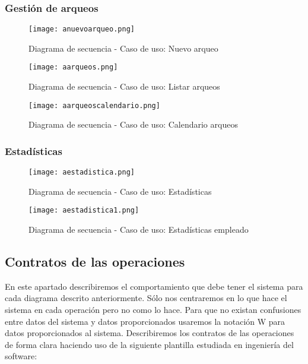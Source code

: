 \subsubsection{Gestión de arqueos}
\begin{figure}[!htb]
  \centering
    \texttt{[image: anuevoarqueo.png]}
  \caption{Diagrama de secuencia - Caso de uso: Nuevo arqueo }
  \label{a}
\end{figure}

\begin{figure}[!htb]
  \centering
    \texttt{[image: aarqueos.png]}
  \caption{Diagrama de secuencia - Caso de uso: Listar arqueos }
  \label{a}
\end{figure}

\begin{figure}[!htb]
  \centering
    \texttt{[image: aarqueoscalendario.png]}
  \caption{Diagrama de secuencia - Caso de uso: Calendario arqueos }
  \label{a}
\end{figure}

\subsubsection{Estadísticas}
\begin{figure}[!htb]
  \centering
    \texttt{[image: aestadistica.png]}
  \caption{Diagrama de secuencia - Caso de uso: Estadísticas }
  \label{a}
\end{figure}

\begin{figure}[!htb]
  \centering
    \texttt{[image: aestadistica1.png]}
  \caption{Diagrama de secuencia - Caso de uso: Estadísticas empleado }
  \label{a}
\end{figure}

\newpage
\subsection{Contratos de las operaciones}

En este apartado describiremos el comportamiento que debe tener el sistema para cada diagrama descrito anteriormente. Sólo nos centraremos en lo que hace el sistema en cada operación pero no como lo hace. Para que no existan confusiones entre datos del sistema y datos proporcionados usaremos la notación W para datos proporcionados al sistema. Describiremos los contratos de las operaciones de forma clara haciendo uso de la siguiente plantilla estudiada en ingeniería del software:

